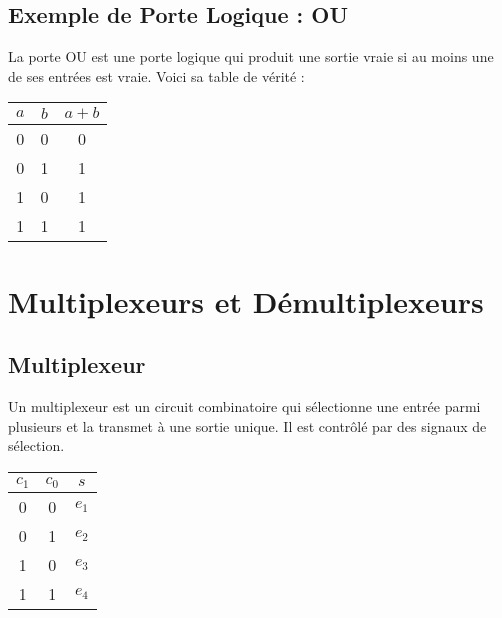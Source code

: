 \documentclass[10pt,a4paper]{article}
\begin{document}

\subsection*{Exemple de Porte Logique : OU}

La porte OU est une porte logique qui produit une sortie vraie si au moins une de ses entrées est vraie. Voici sa table de vérité :

\begin{center}
    \begin{tabular}{|c|c|c|}
    \hline
    \( a \) & \( b \) & \( a + b \) \\
    \hline
    0 & 0 & 0 \\
    0 & 1 & 1 \\
    1 & 0 & 1 \\
    1 & 1 & 1 \\
    \hline
    \end{tabular}
\end{center}


\section*{Multiplexeurs et Démultiplexeurs}

\subsection*{Multiplexeur}

Un multiplexeur est un circuit combinatoire qui sélectionne une entrée parmi plusieurs et la transmet à une sortie unique. Il est contrôlé par des signaux de sélection.

\begin{center}
    \begin{tabular}{|c|c|c|}
    \hline
    \( c_1 \) & \( c_0 \) & \( s \) \\
    \hline
    0 & 0 & \( e_1 \) \\
    0 & 1 & \( e_2 \) \\
    1 & 0 & \( e_3 \) \\
    1 & 1 & \( e_4 \) \\
    \hline
    \end{tabular}
\end{center}
\end{document}
